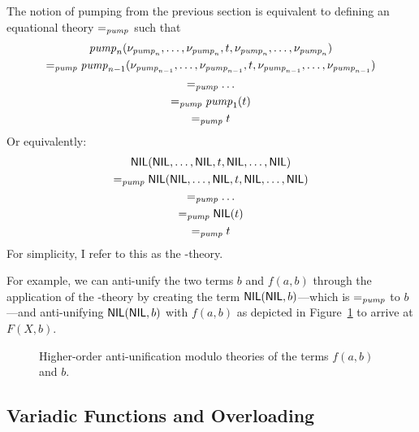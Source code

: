 The notion of pumping from the previous section is equivalent to defining an equational theory $=_{\mathit{pump}}$ such that
\begin{gather*}
\mathit{pump}_n(\nu_{\mathit{pump}_n}, \ldots, \nu_{\mathit{pump}_n}, t, \nu_{\mathit{pump}_n}, \ldots, \nu_{\mathit{pump}_n})\\
=_{\mathit{pump}} \mathit{pump}_{n-1}(\nu_{\mathit{pump}_{n-1}}, \ldots, \nu_{\mathit{pump}_{n-1}}, t, \nu_{\mathit{pump}_{n-1}}, \ldots, \nu_{\mathit{pump}_{n-1}})\\
=_{\mathit{pump}} \ldots\\
=_{\mathit{pump}} \mathit{pump}_1(t)\\
=_{\mathit{pump}} t
\end{gather*}
Or equivalently:
\begin{gather*}
\textsf{NIL}(\textsf{NIL}, \ldots, \textsf{NIL}, t, \textsf{NIL}, \ldots, \textsf{NIL})\\
=_{\mathit{pump}} \textsf{NIL}(\textsf{NIL}, \ldots, \textsf{NIL}, t, \textsf{NIL}, \ldots, \textsf{NIL})\\
=_{\mathit{pump}} \ldots\\
=_{\mathit{pump}} \textsf{NIL}(t)\\
=_{\mathit{pump}} t
\end{gather*}
For simplicity, I refer to this as the \NIL{}-theory.

For example, we can anti-unify the two terms $b$ and $f(a,b)$ through the application of the \NIL{}-theory by creating the term $\textsf{NIL}(\textsf{NIL},b)$---which is $=_{\mathit{pump}}$ to $b$---and anti-unifying $\textsf{NIL}(\textsf{NIL},b)$ with $f(a,b)$ as depicted in Figure~\ref{fig:anti-nil} to arrive at $F(X, b)$.

\begin{figure}[t]
\centering{}
\caption{Higher-order anti-unification modulo theories of the terms $f(a, b)$ and $b$.\label{fig:anti-nil}}
\end{figure}

\subsection{Variadic Functions and Overloading}

